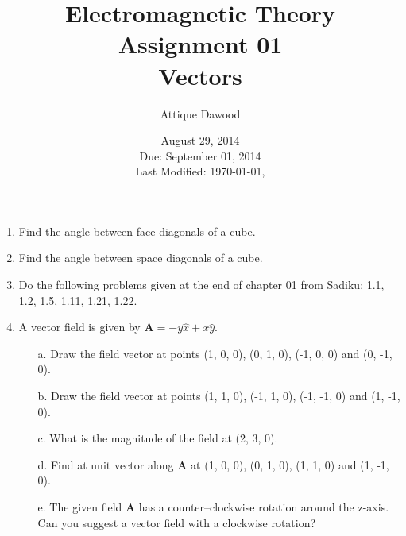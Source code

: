 \documentclass[12pt,a4paper]{article}
\title{Electromagnetic Theory\\Assignment 01\\Vectors}
\author{Attique Dawood}
\date{August 29, 2014\\Due: September 01, 2014\\[0.2cm] Last Modified: \today, \currenttime}
\begin{document}
\maketitle
\begin{enumerate}
\item Find the angle between face diagonals of a cube.
\item Find the angle between space diagonals of a cube.
\item Do the following problems given at the end of chapter 01 from Sadiku: 1.1, 1.2, 1.5, 1.11, 1.21, 1.22.
\item A vector field is given by $\textbf{A}=-y\hat x+x\hat y$.
\begin{enumerate}
\item[a.] Draw the field vector at points (1, 0, 0), (0, 1, 0), (-1, 0, 0) and (0, -1, 0).
\item[b.] Draw the field vector at points (1, 1, 0), (-1, 1, 0), (-1, -1, 0) and (1, -1, 0).
\item[c.] What is the magnitude of the field at (2, 3, 0).
\item[d.] Find at unit vector along \textbf{A} at (1, 0, 0), (0, 1, 0), (1, 1, 0) and (1, -1, 0).
\item[e.] The given field \textbf{A} has a counter--clockwise rotation around the z-axis. Can you suggest a vector field with a clockwise rotation?
\end{enumerate}
\end{enumerate}
\end{document}
